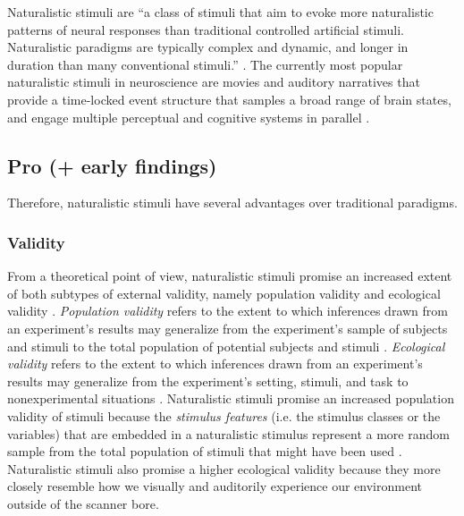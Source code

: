 Naturalistic stimuli are ``a class of stimuli that aim to evoke more
naturalistic patterns of neural responses than traditional controlled artificial
stimuli. Naturalistic paradigms are typically complex and dynamic, and longer in
duration than many conventional stimuli.'' \citep{vanderwal2019movies}.
The currently most popular naturalistic stimuli in neuroscience are movies and
auditory narratives \citep[cf.][for reviews]{jaaskelainen2021movies,
jaaskelainen2020neural} that provide a time-locked event structure that samples
a broad range of brain states, and engage multiple perceptual and cognitive
systems in parallel \citep{haxby2020naturalistic}.


\subsection{Pro (+ early findings)}
%
Therefore, naturalistic stimuli have several advantages over traditional
paradigms.


\subsubsection{Validity}

From a theoretical point of view, naturalistic stimuli promise an increased
extent of both subtypes of external validity, namely population validity and
ecological validity \citep{bracht1968external}.
%
\textit{Population validity} refers to the extent to which inferences drawn from
an experiment's results may generalize from the experiment's sample of subjects
and stimuli to the total population of potential subjects and stimuli
\citep{bracht1968external, westfall2016fixing}.
%
\textit{Ecological validity} refers to the extent to which inferences drawn from
an experiment's results may generalize from the experiment's setting, stimuli,
and task to nonexperimental situations \citep{bracht1968external,
orne1962social, schmuckler2001ecological}.
Naturalistic stimuli promise an increased population validity of stimuli because
the \textit{stimulus features} (i.e. the stimulus classes or the variables) that
are embedded in a naturalistic stimulus represent a more random sample from the
total population of stimuli that might have been used
\citep{westfall2016fixing}.
Naturalistic stimuli also promise a higher ecological validity
\citep{hasson2012future} because they more closely resemble how we visually and
auditorily experience our environment outside of the scanner bore.


